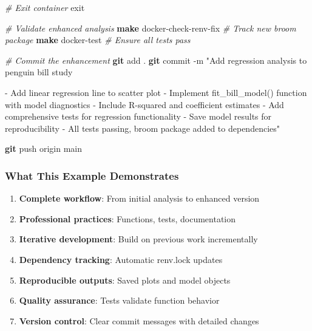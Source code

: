 \documentclass[
]{article}
\newenvironment{Shaded}{\begin{snugshade}}{\end{snugshade}}
\newcommand{\AttributeTok}[1]{\textcolor[rgb]{0.13,0.29,0.53}{#1}}
\newcommand{\BuiltInTok}[1]{#1}
\newcommand{\CommentTok}[1]{\textcolor[rgb]{0.56,0.35,0.01}{\textit{#1}}}
\newcommand{\FunctionTok}[1]{\textcolor[rgb]{0.13,0.29,0.53}{\textbf{#1}}}
\newcommand{\NormalTok}[1]{#1}
\newcommand{\StringTok}[1]{\textcolor[rgb]{0.31,0.60,0.02}{#1}}
\providecommand{\tightlist}{%
  \setlength{\itemsep}{0pt}\setlength{\parskip}{0pt}}
\begin{document}
\begin{Shaded}
\begin{Highlighting}[]
\CommentTok{\# Exit container}
\BuiltInTok{exit}

\CommentTok{\# Validate enhanced analysis}
\FunctionTok{make}\NormalTok{ docker{-}check{-}renv{-}fix    }\CommentTok{\# Track new broom package}
\FunctionTok{make}\NormalTok{ docker{-}test             }\CommentTok{\# Ensure all tests pass}

\CommentTok{\# Commit the enhancement}
\FunctionTok{git}\NormalTok{ add .}
\FunctionTok{git}\NormalTok{ commit }\AttributeTok{{-}m} \StringTok{"Add regression analysis to penguin bill study}

\StringTok{{-} Add linear regression line to scatter plot}
\StringTok{{-} Implement fit\_bill\_model() function with model diagnostics}
\StringTok{{-} Include R{-}squared and coefficient estimates}
\StringTok{{-} Add comprehensive tests for regression functionality  }
\StringTok{{-} Save model results for reproducibility}
\StringTok{{-} All tests passing, broom package added to dependencies"}

\FunctionTok{git}\NormalTok{ push origin main}
\end{Highlighting}
\end{Shaded}

\subsubsection{What This Example
Demonstrates}\label{what-this-example-demonstrates}

\begin{enumerate}
\def\labelenumi{\arabic{enumi}.}
\tightlist
\item
  \textbf{Complete workflow}: From initial analysis to enhanced version
\item
  \textbf{Professional practices}: Functions, tests, documentation
\item
  \textbf{Iterative development}: Build on previous work incrementally\\
\item
  \textbf{Dependency tracking}: Automatic renv.lock updates
\item
  \textbf{Reproducible outputs}: Saved plots and model objects
\item
  \textbf{Quality assurance}: Tests validate function behavior
\item
  \textbf{Version control}: Clear commit messages with detailed changes
\end{enumerate}
\end{document}
